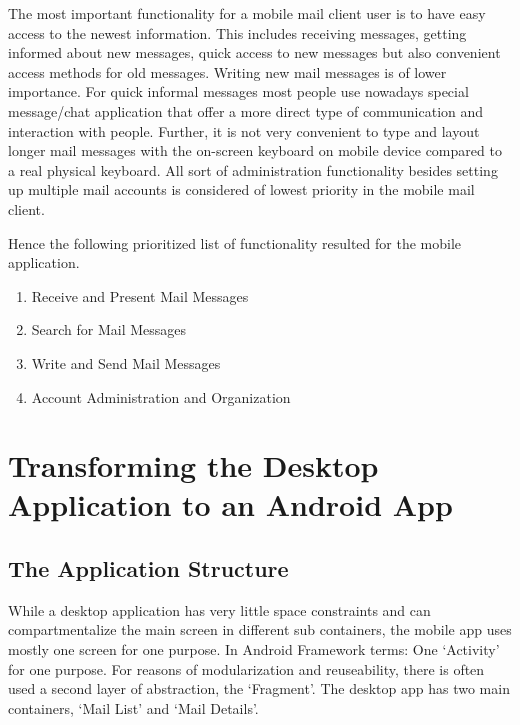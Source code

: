 \documentclass[a4paper,11pt,twoside]{article}
\begin{document}
The most important functionality for a mobile mail client user is to have easy
access to the newest information. This includes receiving messages, getting
informed about new messages, quick access to new messages but also convenient
access methods for old messages. Writing new mail messages is of lower
importance. For quick informal messages most people use nowadays special
message/chat application that offer a more direct type of communication and
interaction with people. Further, it is not very convenient to type and layout
longer mail messages with the on-screen keyboard on mobile device compared to a
real physical keyboard. All sort of administration functionality besides setting
up multiple mail accounts is considered of lowest priority in the mobile mail
client.

Hence the following prioritized list of functionality resulted for the mobile
application.
\begin{enumerate}
  \item Receive and Present Mail Messages
  \item Search for Mail Messages
  \item Write and Send Mail Messages
  \item Account Administration and Organization
\end{enumerate}



\section{Transforming the Desktop Application to an Android App}
\subsection{The Application Structure}
While a desktop application has very little space constraints and can
compartmentalize the main screen in different sub containers, the mobile app
uses mostly one screen for one purpose. In Android Framework terms: One `Activity'
for one purpose. For reasons of modularization and
reuseability, there is often used a second layer of abstraction, the
`Fragment'.  The desktop app has two main containers, `Mail List' and `Mail
Details'.
\end{document}
